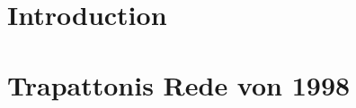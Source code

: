 \documentclass[12pt,        %
  english,ngerman,          %
  paper=a4,                 %
  captions=tablesignature,  %
  listof=numbered,          %
  bibliography=totoc,       %
  headings=small,           %
  headinclude=false,        %
  footinclude=false,        %
  parskip=half-,            %
  oneside,                  %
  DIV=12                    %
]{styles/colireport}
\author
	{
		\coliauthorone,$^{1\ast}$ 
	    	\coliauthortwo,$^{1}$ 
	    	\coliauthorthree$^{2}$
	    	\\
		\\
		\normalsize{$^{1}$
			\coliaddressone
		}
		\\
		\normalsize{
			\coliaddresstwo
		}
		\\
		\normalsize{$^{2}$
			\coliaddressthree
		}
		\\
		\\
		\normalsize{$^\ast$To whom correspondence should be addressed; E-mail:  coliemail}
	}
\begin{document}
 

\maketitle

\begin{minipage}{\textwidth}
	\coliabstract
\end{minipage}





\section*{Introduction}

\lipsum


\section*{Trapattonis Rede von 1998}
\end{document}
